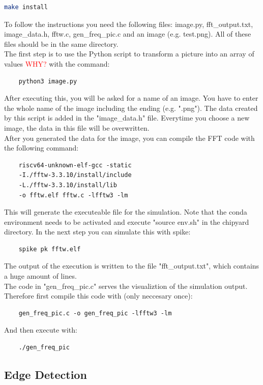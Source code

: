 \documentclass{article}
\begin{document}
{\begin{lstlisting}[language=bash]
    make install
\end{lstlisting}
To follow the instructions you need the following files:  image.py, fft\_output.txt, image\_data.h, fftw.c, gen\_freq\_pic.c and an image (e.g. test.png). All of these files should be in the
same directory.\\
The first step is to use the Python script to transform a picture into an array of values \textcolor{red}{WHY?} with 
the command:\\
\begin{lstlisting}
    python3 image.py
\end{lstlisting}
After executing this, you will be asked for a name of an image. You have to enter the whole name of the image including the ending (e.g. ".png"). 
The data created by this script is added in the "image\_data.h" file. Everytime you choose a new image, the data in this file will be overwritten.\\
After you generated the data for the image, you can compile the FFT code with the following command:\\
\begin{lstlisting}
    riscv64-unknown-elf-gcc -static 
    -I./fftw-3.3.10/install/include 
    -L./fftw-3.3.10/install/lib 
    -o fftw.elf fftw.c -lfftw3 -lm
\end{lstlisting}
This will generate the executeable file for the simulation. Note that the conda environment needs to be activated and execute "source env.sh" in the chipyard directory. In the next step you can simulate this with spike:\\
\begin{lstlisting}
    spike pk fftw.elf
\end{lstlisting}
The output of the execution is written to the file "fft\_output.txt", which contains a huge amount of lines.\\
The code in "gen\_freq\_pic.c" serves the visualiztion of the simulation output. Therefore first compile this code with (only neccesary once):\\
\begin{lstlisting}
    gen_freq_pic.c -o gen_freq_pic -lfftw3 -lm
\end{lstlisting}
And then execute with:\\
\begin{lstlisting}
    ./gen_freq_pic
\end{lstlisting}
\subsection*{Edge Detection}

}
\end{document}
